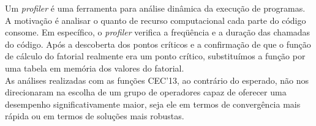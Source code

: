 Um {\it profiler} é uma ferramenta para análise dinâmica da execução de programas. A motivação é analisar o quanto de recurso computacional cada parte do código consome. Em específico, o {\it profiler} verifica a freqüência e a duração das chamadas do código. Após a descoberta dos pontos críticos e a confirmação de que o função de cálculo do fatorial realmente era um ponto crítico, substituímos a função por uma tabela em memória dos valores do fatorial.\\


As análises realizadas com as funções CEC'13, ao contrário do esperado, não nos direcionaram na escolha de um grupo de operadores capaz de oferecer uma desempenho significativamente maior, seja ele em termos de convergência mais rápida ou em termos de soluções mais robustas.\\

